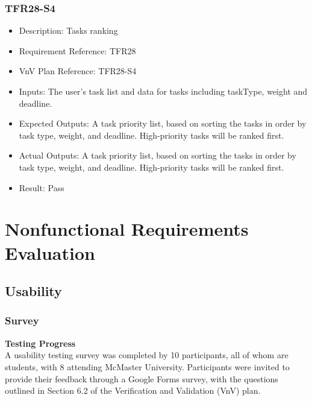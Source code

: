 \documentclass[12pt, titlepage]{article}
\begin{document}
\subsubsection{TFR28-S4}\label{3.2.17}
\begin{itemize}
    \item Description: Tasks ranking
    \item Requirement Reference: TFR28
    \item VnV Plan Reference: TFR28-S4
    \item Inputs: The user’s task list and data for tasks including taskType, weight and
deadline.
    \item Expected Outputs: A task priority list, based on sorting the tasks in order by task type,
weight, and deadline. High-priority tasks will be ranked first.
    \item Actual Outputs: A task priority list, based on sorting the tasks in order by task type,
weight, and deadline. High-priority tasks will be ranked first.
    \item Result: Pass
\end{itemize}



\section{Nonfunctional Requirements Evaluation}

\subsection{Usability}
\subsubsection{Survey}\label{4.1.1}
\textbf{Testing Progress} \\

\noindent A usability testing survey was completed by 10 participants, all of whom are students, with 8 attending McMaster University. Participants were invited to provide their feedback through a Google Forms survey, with the questions outlined in Section 6.2 of the Verification and Validation (VnV) plan.\\
\end{document}
